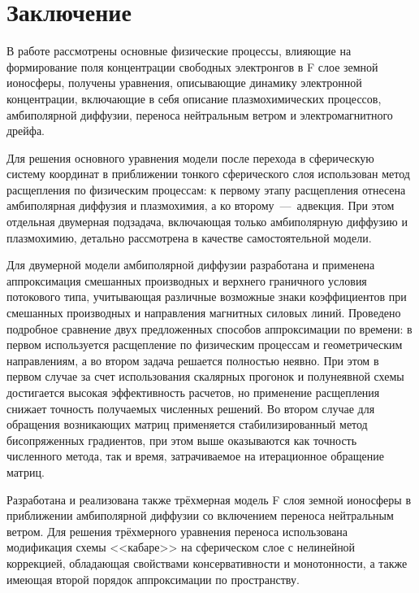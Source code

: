 \documentclass[14pt, a4paper]{extarticle}
\begin{document}
\newpage

\section{Заключение}

В работе рассмотрены основные физические процессы, влияющие на формирование поля концентрации свободных электронгов в F слое земной ионосферы, получены уравнения, описывающие динамику электронной концентрации, включающие в себя описание плазмохимических процессов, амбиполярной диффузии, переноса нейтральным ветром и электромагнитного дрейфа.

Для решения основного уравнения модели после перехода в сферическую систему координат в приближении тонкого сферического слоя использован метод расщепления по физическим процессам: к первому этапу расщепления отнесена амбиполярная диффузия  и плазмохимия, а ко второму~---~адвекция. При этом отдельная двумерная подзадача, включающая только амбиполярную диффузию и плазмохимию, детально рассмотрена в качестве самостоятельной модели.

Для двумерной модели амбиполярной диффузии разработана и применена аппроксимация смешанных производных и верхнего граничного условия потокового типа, учитывающая различные возможные знаки коэффициентов при смешанных производных и направления магнитных силовых линий. Проведено подробное сравнение двух предложенных способов аппроксимации по времени: в первом используется расщепление по физическим процессам и геометрическим направлениям, а во втором задача решается полностью неявно. При этом в первом случае за счет использования скалярных прогонок и полунеявной схемы достигается высокая эффективность расчетов, но применение расщепления снижает точность получаемых численных решений. Во втором случае для обращения возникающих матриц применяется стабилизированный метод бисопряженных градиентов, при этом выше оказываются как точность численного метода, так и время, затрачиваемое на итерационное обращение матриц.

Разработана и реализована также трёхмерная модель F слоя земной ионосферы в приближении амбиполярной диффузии со включением переноса нейтральным ветром. Для решения трёхмерного уравнения переноса использована модификация схемы <<кабаре>> на сферическом слое с нелинейной коррекцией, обладающая свойствами консервативности и монотонности, а также имеющая второй порядок аппроксимации по пространству.
\end{document}
